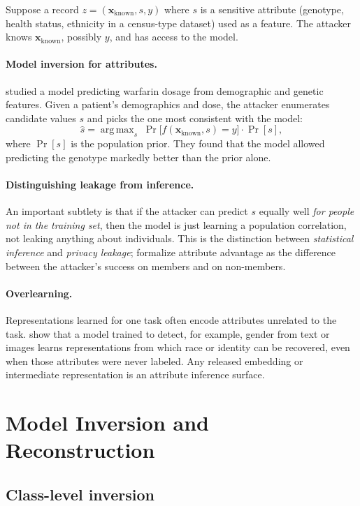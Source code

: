 \documentclass[10pt,a4paper]{extarticle}
\theoremstyle{definition}
\newcommand{\x}{\mathbf{x}}
\DeclareMathOperator*{\argmax}{arg\,max}
\begin{document}
Suppose a record \(z=(\x_{\text{known}},s,y)\) where \(s\) is a sensitive attribute (genotype, health status, ethnicity in a census-type dataset) used as a feature. The attacker knows \(\x_{\text{known}}\), possibly \(y\), and has access to the model.

\paragraph{Model inversion for attributes.} \citet{fredrikson2014privacy} studied a model predicting warfarin dosage from demographic and genetic features. Given a patient's demographics and dose, the attacker enumerates candidate values \(s\) and picks the one most consistent with the model:
\[
\hat s = \argmax_{s}\;\Pr\big[f(\x_{\text{known}},s)=y\big]\cdot\Pr[s],
\]
where \(\Pr[s]\) is the population prior. They found that the model allowed predicting the genotype markedly better than the prior alone.

\paragraph{Distinguishing leakage from inference.} An important subtlety is that if the attacker can predict \(s\) equally well \emph{for people not in the training set}, then the model is just learning a population correlation, not leaking anything about individuals. This is the distinction between \emph{statistical inference} and \emph{privacy leakage}; \citet{yeom2018privacy} formalize attribute advantage as the difference between the attacker's success on members and on non-members.

\paragraph{Overlearning.} Representations learned for one task often encode attributes unrelated to the task. \citet{song2020overlearning} show that a model trained to detect, for example, gender from text or images learns representations from which race or identity can be recovered, even when those attributes were never labeled. Any released embedding or intermediate representation is an attribute inference surface.

\section{Model Inversion and Reconstruction}

\subsection{Class-level inversion}
\end{document}
